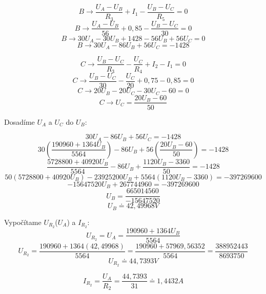 {\large\[ B \rightarrow \frac{U_A - U_B}{R_3} + I_1 - \frac{U_B - U_C}{R_5} = 0\]}
{\large\[ B \rightarrow \frac{U_A - U_B}{56} + 0,85 - \frac{U_B - U_C}{30} = 0\]}
{\large\[ B \rightarrow 30U_A - 30U_B + 1428 - 56U_B + 56U_C = 0\]}
{\large\[ B \rightarrow 30U_A - 86U_B + 56U_C = -1428\]}
\bigskip

{\large\[ C \rightarrow \frac{U_B - U_C}{R_3} - \frac{U_C}{R_4} + I_2 - I_1 = 0\]}
{\large\[ C \rightarrow \frac{U_B - U_C}{30} - \frac{U_C}{20} + 0,75 - 0,85 = 0\]}
{\large\[ C \rightarrow 20U_B - 20U_C - 30U_C - 60 = 0\]}
{\large\[ C \rightarrow U_C = \frac{20U_B - 60}{50}\]}
\newpage

{\Large Dosadíme $U_A$ a $U_C$ do $U_B$:}

{\large\[ 30U_A - 86U_B + 56U_C = -1428\]}
{\large\[ 30\left(\frac{190960 + 1364U_B}{5564}\right) - 86U_B + 56\left(\frac{20U_B - 60}{50}\right) = -1428\]}
{\large\[ \frac{5728800 + 40920U_B}{5564} - 86U_B + \frac{1120U_B - 3360}{50} = -1428\]}
{\large\[ 50(5728800 + 40920U_B) - 23925200U_B + 5564(1120U_B - 3360) = -397269600\]}
{\large\[ -15647520U_B + 267744960 = -397269600\]}
{\large\[ U_B = \frac{665014560}{-15647520}\]}
{\large\[ U_B \doteq 42,49968V\]}
\bigskip

{\Large Vypočítame $U_{R_2}$($U_A$) a $I_{R_2}$:}
{\large\[ U_{R_2} = U_A = \frac{190960 + 1364U_B}{5564}\]}
{\large\[ U_{R_2} = \frac{190960 + 1364(42,49968)}{5564} = \frac{190960 + 57969,56352}{5564} = \frac{388952443}{8693750}\]}
{\large\[ U_{R_2} \doteq 44,7393V\]}
\bigskip

{\large\[ I_{R_2} = \frac{U_A}{R_2} = \frac{44,7393}{31} \doteq 1,4432A\]}
